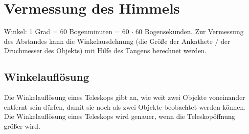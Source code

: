 \documentclass[a4paper,12pt]{article}
\begin{document}
\section{Vermessung des Himmels}
Winkel: 1 Grad = 60 Bogenminuten = 60 $\cdot $ 60 Bogensekunden. Zur Vermessung des Abstandes kann die Winkelausdehnung (die Größe der Ankathete / der Druchmesser des Objekts) mit Hilfe des Tangens berechnet werden.

\subsection{Winkelauflösung}
Die Winkelauflösung eines Teleskops gibt an, wie weit zwei Objekte voneinander entfernt sein dürfen, damit sie noch als zwei Objekte beobachtet werden können. Die Winkelauflösung eines Teleskops wird genauer, wenn die Teleskopöffnung größer wird.
\end{document}
